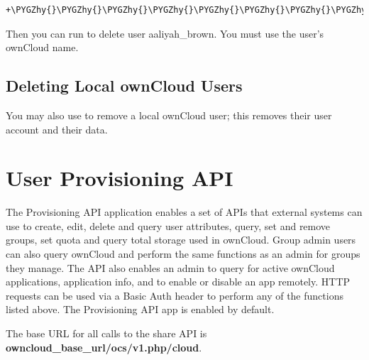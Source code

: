 \documentclass[letterpaper,10pt,english]{sphinxmanual}
\def\PYGZhy{\char`\-}
\begin{document}
\begin{Verbatim}[commandchars=\\\{\}]
+\PYGZhy{}\PYGZhy{}\PYGZhy{}\PYGZhy{}\PYGZhy{}\PYGZhy{}\PYGZhy{}\PYGZhy{}\PYGZhy{}\PYGZhy{}\PYGZhy{}\PYGZhy{}\PYGZhy{}\PYGZhy{}\PYGZhy{}\PYGZhy{}\PYGZhy{}+\PYGZhy{}\PYGZhy{}\PYGZhy{}\PYGZhy{}\PYGZhy{}\PYGZhy{}\PYGZhy{}\PYGZhy{}\PYGZhy{}\PYGZhy{}\PYGZhy{}\PYGZhy{}\PYGZhy{}\PYGZhy{}\PYGZhy{}\PYGZhy{}\PYGZhy{}+\PYGZhy{}\PYGZhy{}\PYGZhy{}\PYGZhy{}\PYGZhy{}\PYGZhy{}\PYGZhy{}\PYGZhy{}\PYGZhy{}\PYGZhy{}\PYGZhy{}\PYGZhy{}\PYGZhy{}\PYGZhy{}\PYGZhy{}\PYGZhy{}\PYGZhy{}\PYGZhy{}+\PYGZhy{}\PYGZhy{}\PYGZhy{}\PYGZhy{}\PYGZhy{}\PYGZhy{}\PYGZhy{}\PYGZhy{}\PYGZhy{}\PYGZhy{}\PYGZhy{}\PYGZhy{}\PYGZhy{}\PYGZhy{}\PYGZhy{}\PYGZhy{}\PYGZhy{}\PYGZhy{}\PYGZhy{}\PYGZhy{}\PYGZhy{}\PYGZhy{}\PYGZhy{}\PYGZhy{}\PYGZhy{}\PYGZhy{}\PYGZhy{}\PYGZhy{}\PYGZhy{}\PYGZhy{}\PYGZhy{}\PYGZhy{}\PYGZhy{}\PYGZhy{}\PYGZhy{}\PYGZhy{}\PYGZhy{}\PYGZhy{}+
\end{Verbatim}

Then you can run  to delete
user aaliyah\_brown. You must use the user's ownCloud name.


\subsection{Deleting Local ownCloud Users}
\label{configuration_user/user_auth_ldap_cleanup:deleting-local-owncloud-users}
You may also use  to remove a local ownCloud user;
this removes their user account and their data.


\section{User Provisioning API}
\label{configuration_user/user_provisioning_api::doc}\label{configuration_user/user_provisioning_api:user-provisioning-api}
The Provisioning API application enables a set of APIs that external systems can use to create,
edit, delete and query user attributes, query, set and remove groups, set quota
and query total storage used in ownCloud. Group admin users can also query
ownCloud and perform the same functions as an admin for groups they manage. The
API also enables an admin to query for active ownCloud applications, application
info, and to enable or disable an app remotely. HTTP
requests can be used via a Basic Auth header to perform any of the functions
listed above. The Provisioning API app is enabled by default.

The base URL for all calls to the share API is \textbf{owncloud\_base\_url/ocs/v1.php/cloud}.
\end{document}
